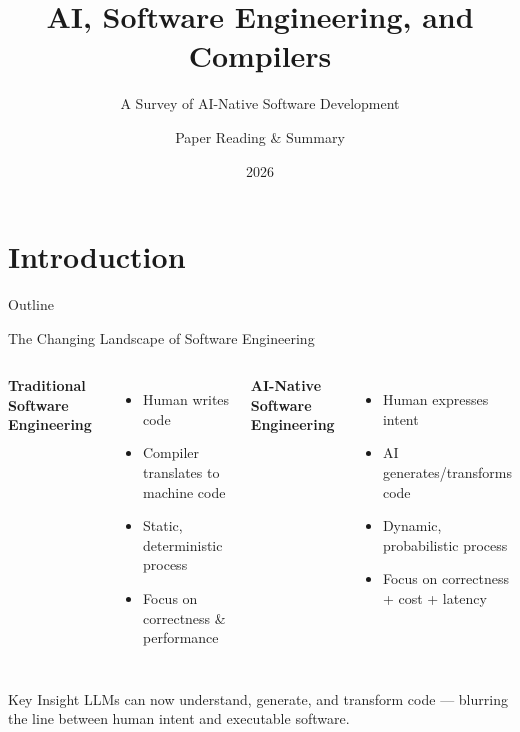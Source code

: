 \documentclass[aspectratio=169,10pt]{beamer}
\title{AI, Software Engineering, and Compilers}
\subtitle{A Survey of AI-Native Software Development}
\author{Paper Reading \& Summary}
\date{2026}
\institute{PhD Seminar}
\begin{document}
\maketitle

\section{Introduction}

\begin{frame}{Outline}
    \tableofcontents
\end{frame}

\begin{frame}{The Changing Landscape of Software Engineering}
    \begin{columns}
    \textbf{Traditional Software Engineering}
    \begin{itemize}
        \item Human writes code
        \item Compiler translates to machine code
        \item Static, deterministic process
        \item Focus on correctness \& performance
    \end{itemize}
    
    \textbf{AI-Native Software Engineering}
    \begin{itemize}
        \item Human expresses \alert{intent}
        \item AI generates/transforms code
        \item Dynamic, probabilistic process
        \item Focus on correctness + cost + latency
    \end{itemize}
    \end{columns}
    
    \vspace{1em}
    \begin{block}{Key Insight}
    LLMs can now understand, generate, and transform code — blurring the line between human intent and executable software.
    \end{block}
\end{frame}
\end{document}
